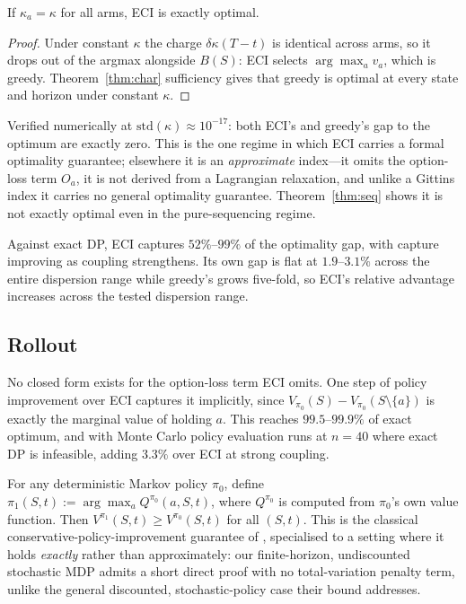 \begin{proposition}
\label{prop:eciexact}
If $\kappa_a = \kappa$ for all arms, ECI is exactly optimal.
\end{proposition}

\begin{proof}
Under constant $\kappa$ the charge $\delta\kappa(T-t)$ is identical across arms, so
it drops out of the argmax alongside $B(S)$: ECI selects $\arg\max_a v_a$, which is
greedy. Theorem~\ref{thm:char} sufficiency gives that greedy is optimal at every
state and horizon under constant $\kappa$.
\end{proof}

Verified numerically at $\mathrm{std}(\kappa) \approx 10^{-17}$: both ECI's and
greedy's gap to the optimum are exactly zero. This is the one regime in which ECI
carries a formal optimality guarantee; elsewhere it is an \emph{approximate}
index---it omits the option-loss term $O_a$, it is not derived from a Lagrangian
relaxation, and unlike a Gittins index it carries no general optimality guarantee.
Theorem~\ref{thm:seq} shows it is not exactly optimal even in the pure-sequencing
regime.

Against exact DP, ECI captures $52\%$--$99\%$ of the optimality gap, with capture
improving as coupling strengthens. Its own gap is flat at $1.9$--$3.1\%$ across the
entire dispersion range while greedy's grows five-fold, so ECI's relative
advantage increases across the tested dispersion range.

\subsection{Rollout}
\label{sec:rollout}

No closed form exists for the option-loss term ECI omits. One step of policy
improvement over ECI captures it implicitly, since
$V_{\pi_0}(S) - V_{\pi_0}(S\setminus\{a\})$ is exactly the marginal value of
holding $a$. This reaches $99.5$--$99.9\%$ of exact optimum, and with Monte Carlo
policy evaluation runs at $n=40$ where exact DP is infeasible, adding $3.3\%$ over
ECI at strong coupling.

\begin{theorem}
\label{thm:polimp}
For any deterministic Markov policy $\pi_0$, define $\pi_1(S,t) :=
\arg\max_a Q^{\pi_0}(a,S,t)$, where $Q^{\pi_0}$ is computed from $\pi_0$'s own
value function. Then $V^{\pi_1}(S,t) \ge V^{\pi_0}(S,t)$ for all $(S,t)$. This
is the classical conservative-policy-improvement guarantee of
\citet{kakadelangford2002}, specialised to a setting where it
holds \emph{exactly} rather than approximately: our finite-horizon,
undiscounted stochastic MDP admits a
short direct proof with no total-variation penalty term, unlike the general
discounted, stochastic-policy case their bound addresses.
\end{theorem}

